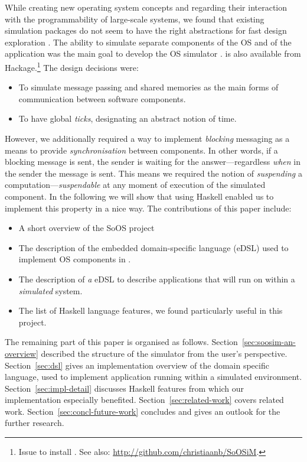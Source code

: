 While creating new operating system concepts and regarding their interaction with the programmability of large-scale systems, we found that existing simulation packages do not seem to have the right abstractions for fast design exploration \cite{cotson,omnet}.
The ability to simulate separate components of the OS and of the application was the main goal to develop the OS simulator \soosim \cite{Baaij:2012}.
\soosim is also available from Hackage.\footnote{Issue  to install \soosim. See also:
\url{http://github.com/christiaanb/SoOSiM}.}
The design decisions were:
\begin{itemize}
\item To simulate message passing and shared memories as the main forms of communication between software components.
\item To have global \emph{ticks}, designating an abstract notion of time.
\end{itemize}
However, we additionally required a way to implement \emph{blocking} messaging as a means to provide \emph{synchronisation} between components.
In other words, if a blocking message is sent, the sender is waiting for the answer---regardless \emph{when} in the sender the message is sent.
This means we required the notion of \emph{suspending} a computation---\emph{suspendable} at any moment of execution of the simulated component.
In the following we will show that using Haskell \cite{haskell-report} enabled us to implement this property in a nice way.
The contributions of this paper include:
\begin{itemize}
\item A short overview of the SoOS project
\item The description of the embedded domain-specific language (eDSL) used to implement OS components in \soosim.
\item The description of \emph{a} eDSL to describe applications that will run on within a \soosim \emph{simulated} system.
\item The list of Haskell language features, we found particularly useful in this project.
\end{itemize}

The remaining part of this paper is organised as follows.
Section~\ref{sec:soosim-an-overview} described the structure of the \soosim simulator from the user's perspective.
Section~\ref{sec:dsl} gives an implementation overview of the domain specific language, used to implement application running within a \soosim simulated environment.
Section~\ref{sec:impl-detail} discusses Haskell features from which our implementation especially benefited.
Section~\ref{sec:related-work} covers related work.
Section~\ref{sec:concl-future-work} concludes and gives an outlook for the further research.

